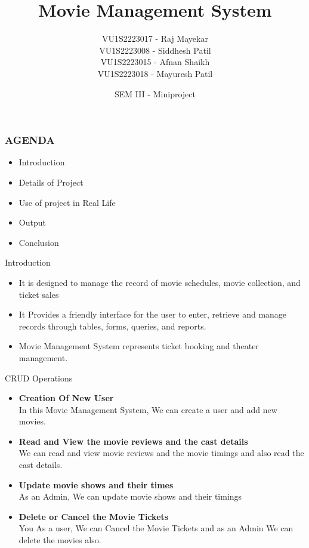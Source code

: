 \documentclass{beamer}
\title{Movie Management System}
\author{ 
        VU1S2223017 - Raj Mayekar\\
        VU1S2223008 - Siddhesh Patil\\
        VU1S2223015 - Afnan Shaikh\\
        VU1S2223018 - Mayuresh Patil
}
\date{SEM III - Miniproject}
\begin{document}
\maketitle  

\begin{frame}
    \frametitle{AGENDA}
    \begin{itemize}
        \item Introduction
        \item Details of Project
        \item Use of project in Real Life
        \item Output
        \item Conclusion
    \end{itemize}
\end{frame}

\begin{frame}{Introduction}
    \begin{itemize}
        \item It is designed to manage the record of movie schedules, movie collection, and ticket sales
                  \vspace{0.5cm}
        \item It Provides a friendly  interface for the user  to enter, retrieve and  manage records through   tables,  forms, queries, and reports.
                  \vspace{0.5cm}
        \item Movie  Management System represents  ticket  booking  and  theater management.
    \end{itemize}
\end{frame}

\begin{frame}{CRUD Operations}
    \begin{itemize}
        \item\textbf {Creation  Of  New  User}
        \\In this Movie Management System, We can create a user and add new movies.
                  \vspace{0.3cm}
        \item\textbf{Read and View the movie reviews and the cast details}
        \\We can read and  view movie reviews and  the movie timings and also  read the cast  details.
                  \vspace{0.3cm}
        \item\textbf{ Update movie shows and their times}
        \\ As an Admin, We can update movie shows and their timings
          \vspace{0.3cm}
        \item\textbf{Delete  or  Cancel  the  Movie  Tickets}
        \\You  As a user, We can  Cancel  the Movie Tickets and  as an Admin We can delete the movies also.
    \end{itemize}
\end{frame}
\end{document}
